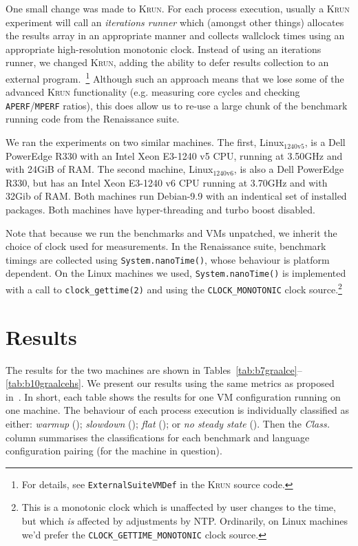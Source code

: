 \documentclass[a4paper]{article}
\newcommand{\krun}{\textsc{Krun}\xspace}
\newcommand{\bencherseven}{Linux$_\mathrm{1240v5}$\xspace}
\newcommand{\bencherten}{Linux$_\mathrm{1240v6}$\xspace}
\begin{document}
One small change was made to \krun. For each process execution, usually a
\krun experiment will call an \emph{iterations runner} which (amongst other
things) allocates the results array in an appropriate manner and collects
wallclock times using an appropriate high-resolution monotonic clock. Instead
of using an iterations runner, we changed \krun, adding the ability to defer
results collection to an external program.~\footnote{For details, see
\texttt{ExternalSuiteVMDef} in the \krun source code.} Although such an approach
means that we lose some of the advanced \krun functionality (e.g.
measuring core cycles and checking \texttt{APERF}/\texttt{MPERF} ratios), this
does allow us to re-use a large chunk of the benchmark running code from the
Renaissance suite.

We ran the experiments on two similar machines. The first, \bencherseven, is a
Dell PowerEdge R330 with an Intel Xeon E3-1240 v5 CPU, running at 3.50GHz and
with 24GiB of RAM. The second machine, \bencherten, is also a Dell PowerEdge
R330, but has an Intel Xeon E3-1240 v6 CPU running at 3.70GHz
and with 32Gib of RAM. Both machines run Debian-9.9 with an indentical set of
installed packages. Both machines have hyper-threading and turbo boost
disabled.

Note that because we run the benchmarks and VMs unpatched, we inherit the
choice of clock used for measurements. In the Renaissance suite, benchmark
timings are collected using \texttt{System.nanoTime()}, whose behaviour is
platform dependent. On the Linux machines we used, \texttt{System.nanoTime()}
is implemented with a call to \texttt{clock\_gettime(2)} and using the
\texttt{CLOCK\_MONOTONIC} clock source.\footnote{This is a monotonic clock which
is unaffected by user changes to the time, but which \emph{is} affected by
adjustments by NTP. Ordinarily, on Linux machines we'd prefer the
\texttt{CLOCK\_GETTIME\_MONOTONIC} clock source.}



\section{Results}
\label{sec:results}

The results for the two machines are shown in
Tables~\ref{tab:b7graalce}--\ref{tab:b10graalcehs}. We present our results
using the same metrics as proposed in~\cite{barrett16warmup}. In short, each
table shows the results for one VM configuration running on one machine. The
behaviour of each process execution is individually classified as either:
\emph{warmup} (\warmup); \emph{slowdown} (\slowdown); \emph{flat} (\flatc); or
\emph{no steady state} (\nosteadystate). Then the \emph{Class.} column
summarises the classifications for each benchmark and language configuration
pairing (for the machine in question).
\end{document}
